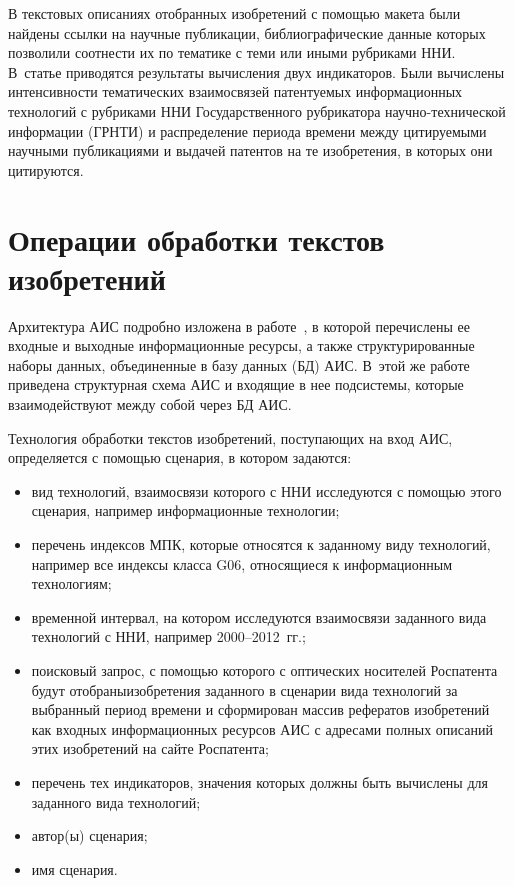 \begin{multicols}{2}
     В текстовых описаниях отобранных изобретений с помощью макета были найдены ссылки на научные
публикации, библиографические данные которых позволили соотнести их по тематике с
теми или иными рубриками
ННИ. В~статье приводятся результаты вычисления двух индикаторов. Были вычислены интенсивности тематических
взаимосвязей патентуемых информационных технологий с рубриками ННИ Государственного рубрикатора
на\-уч\-но-тех\-ни\-че\-ской информации (ГРНТИ) и распределение периода времени между цитируемыми научными публикациями и выдачей
патентов на те изобретения, в которых они цитируются.

\section{Операции обработки текстов изобретений}

     Архитектура АИС подробно изложена в работе~\cite{13-zat}, в которой перечислены ее входные и выходные
информационные ресурсы, а также структурированные наборы данных, объединенные в
базу данных (БД) АИС. В~этой же работе
приведена структурная схема АИС и входящие в нее подсистемы, которые взаимодействуют между собой через БД
АИС.

     Технология обработки текстов изобретений, поступающих на вход АИС, определяется с помощью сценария, в
котором задаются:
     \begin{itemize}
\item вид технологий, взаимосвязи которого с ННИ исследуются с помощью этого сценария, например информационные технологии;
\item перечень индексов МПК, которые относятся к заданному виду технологий, например все индексы класса G06, относящиеся к
информационным технологиям;
\item временной интервал, на котором исследуются взаимосвязи заданного вида технологий с ННИ, например 2000--2012~гг.;
\item поисковый запрос, с помощью которого с оптических носителей Роспатента будут
отобраны\linebreak изобретения заданного в сценарии
вида тех\-нологий за выбранный период времени и сфор\-мирован массив рефератов
изобретений как \mbox{входных} информационных
ресурсов АИС с адресами полных описаний этих изобретений на сайте Роспатента;
\item перечень тех индикаторов, значения которых должны быть вычислены для заданного вида технологий;
\item автор(ы) сценария;
\item имя сценария.
\end{itemize}


\end{multicols}
